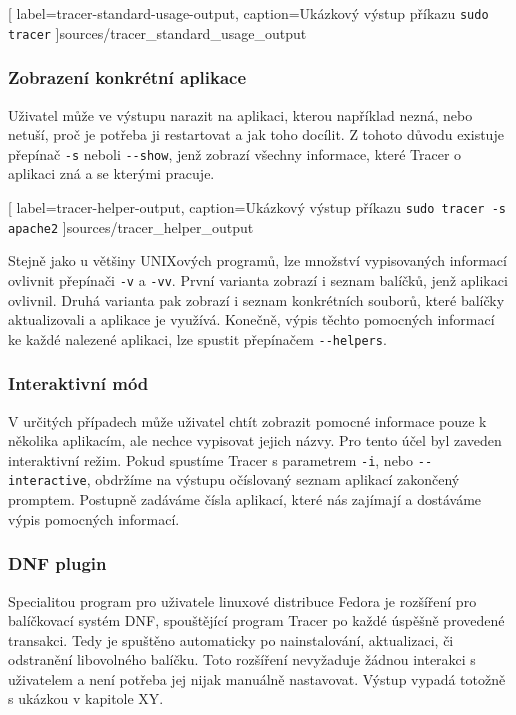 \documentclass[
  field=inf,
  biblatex,
  glossaries,
  index
]{kidiplom}
\begin{document}
		
		[
			label=tracer-standard-usage-output,
			caption={Ukázkový výstup příkazu \texttt{sudo tracer}}
		]{sources/tracer_standard_usage_output}

		\pagebreak
		\subsubsection{Zobrazení konkrétní aplikace}
		Uživatel může ve výstupu narazit na aplikaci, kterou například nezná, nebo netuší, proč je potřeba ji restartovat a jak toho docílit. Z tohoto důvodu existuje přepínač \texttt{-s} neboli \texttt{-{}-show}, jenž zobrazí všechny informace, které Tracer o aplikaci zná a se kterými pracuje.

		
		[
			label=tracer-helper-output,
			caption={Ukázkový výstup příkazu \texttt{sudo tracer -s apache2}}
		]{sources/tracer_helper_output}

		Stejně jako u většiny UNIXových programů, lze množství vypisovaných informací ovlivnit přepínači \texttt{-v} a \texttt{-vv}. První varianta zobrazí i seznam balíčků, jenž aplikaci ovlivnil. Druhá varianta pak zobrazí i seznam konkrétních souborů, které balíčky aktualizovali a aplikace je využívá. Konečně, výpis těchto pomocných informací ke každé nalezené aplikaci, lze spustit přepínačem \texttt{-{}-helpers}.

		\subsubsection{Interaktivní mód}
		V určitých případech může uživatel chtít zobrazit pomocné informace pouze k několika aplikacím, ale nechce vypisovat jejich názvy. Pro tento účel byl zaveden interaktivní režim. Pokud spustíme Tracer s parametrem \texttt{-i}, nebo \texttt{-{}-interactive}, obdržíme na výstupu očíslovaný seznam aplikací zakončený promptem. Postupně zadáváme čísla aplikací, které nás zajímají a dostáváme výpis pomocných informací.

		\subsubsection{DNF plugin}
		Specialitou program pro uživatele linuxové distribuce Fedora je rozšíření pro balíčkovací systém DNF, spouštějící program Tracer po každé úspěšně provedené transakci. Tedy je spuštěno automaticky po nainstalování, aktualizaci, či odstranění libovolného balíčku. Toto rozšíření nevyžaduje žádnou interakci s uživatelem a není potřeba jej nijak manuálně nastavovat. Výstup vypadá totožně s ukázkou v kapitole XY.
\end{document}
